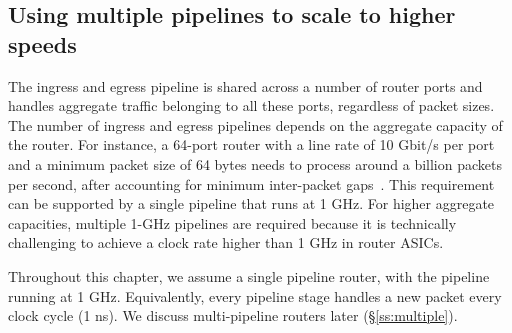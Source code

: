 \subsection{Using multiple pipelines to scale to higher speeds}
The ingress and egress pipeline is shared across a number of router ports and
handles aggregate traffic belonging to all these ports, regardless of packet
sizes. The number of ingress and egress pipelines depends on the aggregate
capacity of the router. For instance, a 64-port router with a line rate of 10
Gbit/s per port and a minimum packet size of 64 bytes needs to process around a
billion packets per second, after accounting for minimum inter-packet
gaps~\cite{rmt}.  This requirement can be supported by a single pipeline that
runs at 1 GHz.  For higher aggregate capacities, multiple 1-GHz pipelines are
required because it is technically challenging to achieve a clock rate higher
than 1 GHz in router ASICs.

 Throughout this chapter, we
assume a single pipeline router, with the pipeline running at 1 GHz.
Equivalently, every pipeline stage handles a new packet every clock cycle (1
ns). We discuss multi-pipeline routers later (\S\ref{ss:multiple}). 




